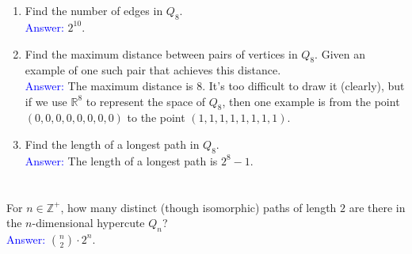\documentclass[a4paper]{article}
\begin{document}
\section{}
\begin{enumerate}[label=\alph*)]
    \item Find the number of edges in $Q_8$.\\
        \textcolor{blue}{Answer:} $2^{10}$.
    \item Find the maximum distance between pairs of vertices in $Q_8$. Given an example of one such pair that achieves this distance.\\
        \textcolor{blue}{Answer:} The maximum distance is $8$. It's too difficult to draw it (clearly), but if we use $\mathbb{R}^8$ to represent the space of $Q_8$, then one example is from the point $(0,0,0,0,0,0,0,0)$ to the point $(1,1,1,1,1,1,1,1)$.
    \item Find the length of a longest path in $Q_8$.\\
        \textcolor{blue}{Answer:} The length of a longest path is $2^8-1$.
\end{enumerate}

\section{}
For $n\in\mathbb{Z^+}$, how many distinct (though isomorphic) paths of length $2$ are there in the $n$-dimensional hypercute $Q_n$?\\
    \textcolor{blue}{Answer:} $\binom{n}{2}\cdot2^n$.
\end{document}
